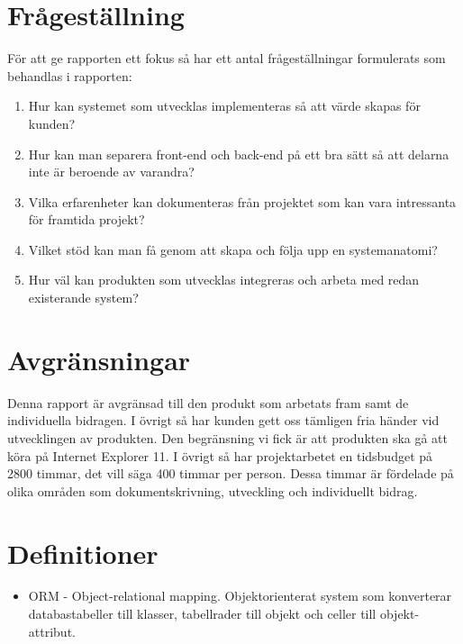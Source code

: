 \section{Frågeställning}
För att ge rapporten ett fokus så har ett antal frågeställningar formulerats som behandlas i rapporten:
\begin{enumerate}
	\item Hur kan systemet som utvecklas implementeras så att värde skapas för kunden?
	\item Hur kan man separera front-end och back-end på ett bra sätt så att delarna inte är beroende av varandra?
	\item Vilka erfarenheter kan dokumenteras från projektet som kan vara intressanta för framtida projekt?
	\item Vilket stöd kan man få genom att skapa och följa upp en systemanatomi?
	\item Hur väl kan produkten som utvecklas integreras och arbeta med redan existerande system? 
\end{enumerate}

\section{Avgränsningar}
Denna rapport är avgränsad till den produkt som arbetats fram samt de individuella bidragen. I övrigt så har kunden gett oss tämligen fria händer vid utvecklingen av produkten. Den begränsning vi fick är att produkten ska gå att köra på Internet Explorer 11.
I övrigt så har projektarbetet en tidsbudget på 2800 timmar, det vill säga 400 timmar per person. Dessa timmar är fördelade på olika områden som dokumentskrivning, utveckling och individuellt bidrag.

\section{Definitioner}

\begin{itemize}

\item ORM - Object-relational mapping. Objektorienterat system som konverterar databastabeller till klasser, tabellrader till objekt och celler till objekt-attribut.

\end{itemize}

\newpage
